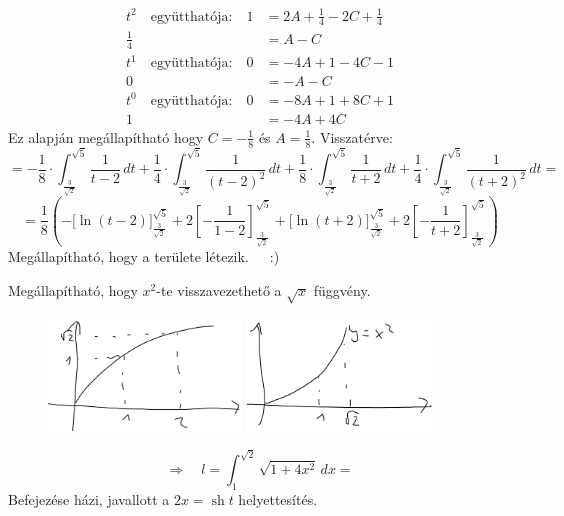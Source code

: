 \documentclass[a4paper,11.5pt]{article}
\DeclareMathOperator{\sh}{sh}
\begin{document}
\begin{exercise}
\begin{align*}
			t^2 \quad \text{együtthatója:}\quad 
												1&=2A+\frac{1}{4}-2C+\frac{1}{4}\\
											   \frac{1}{4}&=A-C\\
			t^1 \quad \text{együtthatója:}\quad 0&=-4A+1-4C-1\\
												0&=-A-C\\
			t^0 \quad \text{együtthatója:}\quad 0&=-8A+1+8C+1\\
												1&=-4A+4C
		\end{align*}
		Ez alapján megállapítható hogy $C=-\frac{1}{8}$ és $A=\frac{1}{8}$. Visszatérve:
		\[=-\frac{1}{8}\cdot\int_{\frac{3}{\sqrt{2}}}^{\sqrt{5}}\frac{1}{t-2}\,dt+\frac{1}{4}\cdot\int_{\frac{3}{\sqrt{2}}}^{\sqrt{5}}\frac{1}{(t-2)^2}\,dt+\frac{1}{8}\cdot\int_{\frac{3}{\sqrt{2}}}^{\sqrt{5}}\frac{1}{t+2}\,dt+\frac{1}{4}\cdot\int_{\frac{3}{\sqrt{2}}}^{\sqrt{5}}\frac{1	}{(t+2)^2}\,dt=\]
		\[= \frac{1}{8}\left(-\Big[\ln(t-2)\Big]^{\sqrt{5}}_{\frac{3}{\sqrt{2}}}+2\left[-\frac{1}{1-2}\right]^{\sqrt{5}}_{\frac{3}{\sqrt{2}}}+\Big[\ln(t+2)\Big]^{\sqrt{5}}_{\frac{3}{\sqrt{2}}}+2\left[-\frac{1}{t+2}\right]^{\sqrt{5}}_{\frac{3}{\sqrt{2}}} \right)\]
		Megállapítható, hogy a területe létezik.~~~:)
	\end{exercise}
	\begin{note}
		Megállapítható, hogy $x^2$-te visszavezethető a $\sqrt{x}$ függvény.
		
		\begin{figure}[H]
			\centering
			\includegraphics[height=3cm]{kepek/13.png}\quad \quad \quad 
			\includegraphics[height=3cm]{kepek/14.png}
			\caption{}
		\end{figure}
		\[ \Rightarrow\quad l=\int_1^{\sqrt{2}}\sqrt{1+4x^2}\,dx= \]
		Befejezése házi, javallott a $2x=\sh t$ helyettesítés.
	\end{note}
\end{document}
